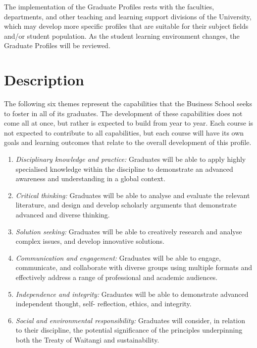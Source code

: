 \documentclass[]{book}
\theoremstyle{definition}
\theoremstyle{definition}
\theoremstyle{definition}
\theoremstyle{remark}
\begin{document}
The implementation of the Graduate Profiles rests with the faculties,
departments, and other teaching and learning support divisions of the
University, which may develop more specific profiles that are suitable
for their subject fields and/or student population. As the student
learning environment changes, the Graduate Profiles will be reviewed.

\hypertarget{description}{%
\section{Description}\label{description}}

The following six themes represent the capabilities that the Business
School seeks to foster in all of its graduates. The development of these
capabilities does not come all at once, but rather is expected to build
from year to year. Each course is not expected to contribute to all
capabilities, but each course will have its own goals and learning
outcomes that relate to the overall development of this profile.

\begin{enumerate}
\def\labelenumi{\arabic{enumi}.}
\item
  \emph{Disciplinary knowledge and practice:} Graduates will be able to
  apply highly specialised knowledge within the discipline to
  demonstrate an advanced awareness and understanding in a global
  context.
\item
  \emph{Critical thinking:} Graduates will be able to analyse and
  evaluate the relevant literature, and design and develop scholarly
  arguments that demonstrate advanced and diverse thinking.
\item
  \emph{Solution seeking:} Graduates will be able to creatively research
  and analyse complex issues, and develop innovative solutions.
\item
  \emph{Communication and engagement:} Graduates will be able to engage,
  communicate, and collaborate with diverse groups using multiple
  formats and effectively address a range of professional and academic
  audiences.
\item
  \emph{Independence and integrity:} Graduates will be able to
  demonstrate advanced independent thought, self- reflection, ethics,
  and integrity.
\item
  \emph{Social and environmental responsibility:} Graduates will
  consider, in relation to their discipline, the potential significance
  of the principles underpinning both the Treaty of Waitangi and
  sustainability.
\end{enumerate}
\end{document}
